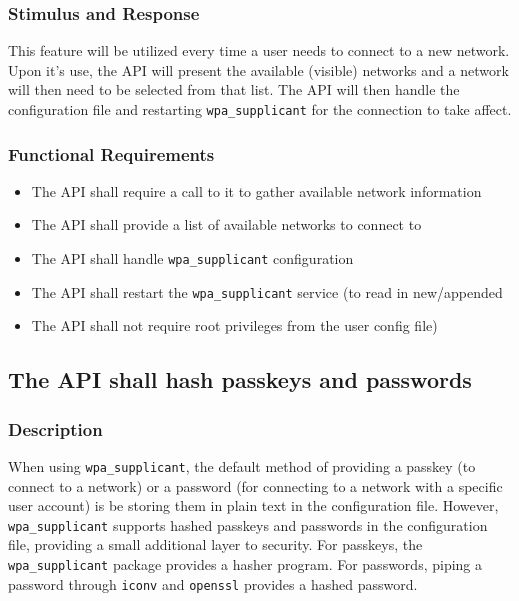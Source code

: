 \subsubsection{Stimulus and Response}
This feature will be utilized every time a user needs to connect to a new network.
Upon it's use, the API will present the available (visible) networks and a network
will then need to be selected from that list. The API will then handle the configuration
file and restarting \texttt{wpa\_supplicant} for the connection to take affect.

\subsubsection{Functional Requirements}

\begin{itemize}
  \item The API shall require a call to it to gather available network information
  \item The API shall provide a list of available networks to connect to
  \item The API shall handle \texttt{wpa\_supplicant} configuration
  \item The API shall restart the \texttt{wpa\_supplicant} service (to read in new/appended 
  \item The API shall not require root privileges from the user
    config file)
\end{itemize}


\subsection{The API shall hash passkeys and passwords}
\subsubsection{Description}
When using \texttt{wpa\_supplicant}, the default method of providing a passkey (to connect
to a network) or a password (for connecting to a network with a specific user account)
is be storing them in plain text in the configuration file. However, \texttt{wpa\_supplicant}
supports hashed passkeys and passwords in the configuration file, providing a
small additional layer to security. For passkeys, the \texttt{wpa\_supplicant} package provides
a hasher program. For passwords, piping a password through \texttt{iconv} and \texttt{openssl} provides
a hashed password.

